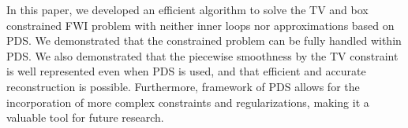 In this paper, we developed an efficient algorithm to solve the TV and box constrained FWI problem with neither inner loops nor approximations based on PDS.
We demonstrated that the constrained problem can be fully handled within PDS.
We also demonstrated that the piecewise smoothness by the TV constraint is well represented even when PDS is used, and that efficient and accurate reconstruction is possible.
Furthermore, framework of PDS allows for the incorporation of more complex constraints and regularizations, making it a valuable tool for future research.

